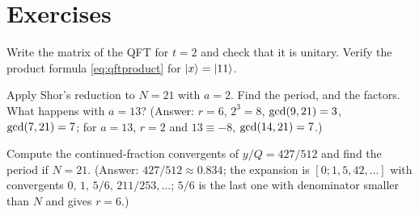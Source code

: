 \section{Exercises}
\begin{exercise}
Write the matrix of the QFT for $t=2$ and check that it is unitary. Verify the product formula \cref{eq:qftproduct} for $\left|x\right\rangle=\left|11\right\rangle$.
\end{exercise}
\begin{exercise}
Apply Shor's reduction to $N=21$ with $a=2$. Find the period, and the factors. What happens with $a=13$? (Answer: $r=6$, $2^3=8$, $\operatorname{gcd}(9,21)=3$, $\operatorname{gcd}(7,21)=7$; for $a=13$, $r=2$ and $13\equiv-8$, $\operatorname{gcd}(14,21)=7$.)
\end{exercise}
\begin{exercise}
Compute the continued-fraction convergents of $y/Q=427/512$ and find the period if $N=21$. (Answer: $427/512\approx0.834$; the expansion is $[0;1,5,42,\dots]$ with convergents $0,\,1,\,5/6,\,211/253,\dots$; $5/6$ is the last one with denominator smaller than $N$ and gives $r=6$.)
\end{exercise}

